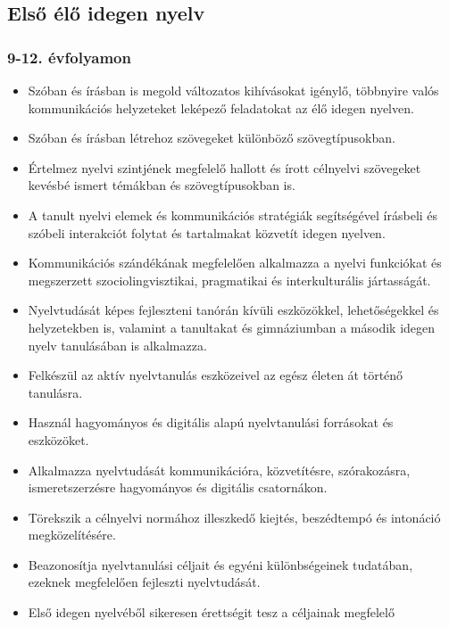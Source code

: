 \hypertarget{elso-elo-idegen-nyelv}{%
\subsection{Első élő idegen nyelv}\label{elso-elo-idegen-nyelv}}

\hypertarget{evfolyamon-2}{%
\subsubsection{9-12. évfolyamon}\label{evfolyamon-2}}

\begin{itemize}
\item
  Szóban és írásban is megold változatos kihívásokat igénylő, többnyire
  valós kommunikációs helyzeteket leképező feladatokat az élő idegen
  nyelven.
\item
  Szóban és írásban létrehoz szövegeket különböző szövegtípusokban.
\item
  Értelmez nyelvi szintjének megfelelő hallott és írott célnyelvi
  szövegeket kevésbé ismert témákban és szövegtípusokban is.
\item
  A tanult nyelvi elemek és kommunikációs stratégiák segítségével
  írásbeli és szóbeli interakciót folytat és tartalmakat közvetít idegen
  nyelven.
\item
  Kommunikációs szándékának megfelelően alkalmazza a nyelvi funkciókat
  és megszerzett szociolingvisztikai, pragmatikai és interkulturális
  jártasságát.
\item
  Nyelvtudását képes fejleszteni tanórán kívüli eszközökkel,
  lehetőségekkel és helyzetekben is, valamint a tanultakat és
  gimnáziumban a második idegen nyelv tanulásában is alkalmazza.
\item
  Felkészül az aktív nyelvtanulás eszközeivel az egész életen át történő
  tanulásra.
\item
  Használ hagyományos és digitális alapú nyelvtanulási forrásokat és
  eszközöket.
\item
  Alkalmazza nyelvtudását kommunikációra, közvetítésre, szórakozásra,
  ismeretszerzésre hagyományos és digitális csatornákon.
\item
  Törekszik a célnyelvi normához illeszkedő kiejtés, beszédtempó és
  intonáció megközelítésére.
\item
  Beazonosítja nyelvtanulási céljait és egyéni különbségeinek tudatában,
  ezeknek megfelelően fejleszti nyelvtudását.
\item
  Első idegen nyelvéből sikeresen érettségit tesz a céljainak megfelelő

\end{itemize}
